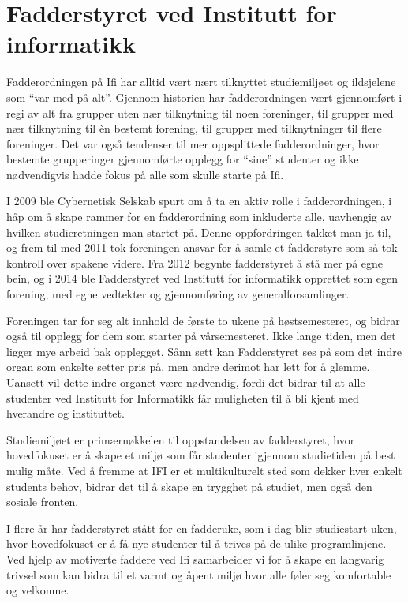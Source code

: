 \chapter{Fadderstyret ved Institutt for informatikk}

\author{Skrevet av Thao Tran, leder for Fadderstyret ved Institutt for informatikk, og Arne Hassel}

Fadderordningen på Ifi har alltid vært nært tilknyttet studiemiljøet og ildsjelene som ``var med på alt''. Gjennom historien har fadderordningen vært gjennomført i regi av alt fra grupper uten nær tilknytning til noen foreninger, til grupper med nær tilknytning til èn bestemt forening, til grupper med tilknytninger til flere foreninger. Det var også tendenser til mer oppsplittede fadderordninger, hvor bestemte grupperinger gjennomførte opplegg for ``sine'' studenter og ikke nødvendigvis hadde fokus på alle som skulle starte på Ifi.

I 2009 ble Cybernetisk Selskab spurt om å ta en aktiv rolle i fadderordningen, i håp om å skape rammer for en fadderordning som inkluderte alle, uavhengig av hvilken studieretningen man startet på. Denne oppfordringen takket man ja til, og frem til med 2011 tok foreningen ansvar for å samle et fadderstyre som så tok kontroll over spakene videre. Fra 2012 begynte fadderstyret å stå mer på egne bein, og i 2014 ble Fadderstyret ved Institutt for informatikk opprettet som egen forening, med egne vedtekter og gjennomføring av generalforsamlinger.

Foreningen tar for seg alt innhold de første to ukene på høstsemesteret, og bidrar også til opplegg for dem som starter på vårsemesteret. Ikke lange tiden, men det ligger mye arbeid bak opplegget. Sånn sett kan Fadderstyret ses på som det indre organ som enkelte setter pris på, men andre derimot har lett for å glemme. Uansett vil dette indre organet være nødvendig, fordi det bidrar til at alle studenter ved Institutt for Informatikk får muligheten til å bli kjent med hverandre og instituttet. 

Studiemiljøet er primærnøkkelen til oppstandelsen av fadderstyret, hvor hovedfokuset er å skape et miljø som får studenter igjennom studietiden på best mulig måte. Ved å fremme at IFI er et multikulturelt sted som dekker hver enkelt students behov, bidrar det til å skape en trygghet på studiet, men også den sosiale fronten.

I flere år har fadderstyret stått for en fadderuke, som i dag blir studiestart uken, hvor hovedfokuset er å få nye studenter til å trives på de ulike programlinjene. Ved hjelp av motiverte faddere ved Ifi samarbeider vi for å skape en langvarig trivsel som kan bidra til et varmt og åpent miljø hvor alle føler seg komfortable og velkomne.
